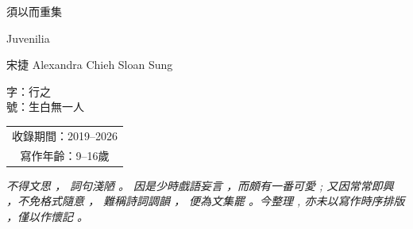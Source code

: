 \documentclass{ctexart}
\begin{document}
	\begin{titlepage}
		\thispagestyle{empty}
		\centering
		
		\vspace*{3.0cm}
		
		{\Large 須以而重集\par}
		\vspace{0.4cm}
		{\Large Juvenilia\par}
		
		\vspace{1.6cm}
		
		{\normalsize 宋捷 Alexandra Chieh Sloan Sung \par}
		\vspace{0.4cm}
		{\normalsize 字：行之\\號：生白無一人\par}
		
		\vspace{1.5cm}
		
		\begin{tabular}{c}
			{\large 收錄期間：2019--2026\par}\\[0.35cm]
			{\large 寫作年齡：9--16歲\par}
		\end{tabular}
		
		\vfill
		
	\end{titlepage}
	
	\begin{titlepage}
		\thispagestyle{empty}
		\centering
		\vspace*{2.2cm}
		
		\begingroup
		\setlength{\parindent}{0pt}
		\setlength{\parskip}{0pt}
		
		\begin{minipage}{0.88\textwidth}
			{\large \itshape
				不得文思 ， 詞句淺陋 。 因是少時戲語妄言 ，而頗有一番可愛 ; 又因常常即興 ，不免格式隨意 ， 難稱詩詞調韻 ， 便為文集罷 。今整理 , 亦未以寫作時序排版 ，僅以作懷記 。}
		\end{minipage}
		
		\endgroup
		
		\vfill
	\end{titlepage}
	
\end{document}
